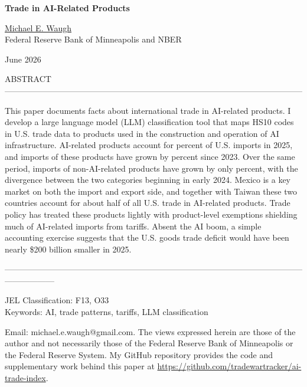 \documentclass[12pt,pdftex]{article}
\begin{document}
\begin{onehalfspacing}

{\large \textbf{Trade in AI-Related Products}}

\vspace{0.5cm}

\href{http://www.waugheconomics.com/}{Michael E. Waugh} \\ Federal Reserve Bank of Minneapolis and NBER

\vspace{0.5cm}

June 2026

\vspace{2.25cm}


\normalsize

ABSTRACT ------------------------------------------------------------------------------------------------------------

This paper documents facts about international trade in AI-related products. I develop a large language model (LLM) classification tool that maps HS10 codes in U.S. trade data to products used in the construction and operation of AI infrastructure. AI-related products account for \aiShareTwentyFive{} percent of U.S. imports in 2025, and imports of these products have grown by \highAiPctChange{} percent since 2023. Over the same period, imports of non-AI-related products have grown by only \lowAiPctChange{} percent, with the divergence between the two categories beginning in early 2024. Mexico is a key market on both the import and export side, and together with Taiwan these two countries account for about half of all U.S. trade in AI-related products. Trade policy has treated these products lightly with product-level exemptions shielding much of AI-related imports from tariffs. Absent the AI boom, a simple accounting exercise suggests that the U.S. goods trade deficit would have been nearly \$200 billion smaller in 2025.

------------------------------------------------------------------------------------------------------------------------------
\vspace{0.25cm}

JEL Classification: F13, O33\\
Keywords: AI, trade patterns, tariffs, LLM classification



\vspace{2.75cm}

{\footnotesize Email: michael.e.waugh@gmail.com. The views expressed herein are those of the author and not necessarily those of the Federal Reserve Bank of Minneapolis or the Federal Reserve System. My GitHub repository provides the code and supplementary work behind this paper at \url{https://github.com/tradewartracker/ai-trade-index}.}


\end{onehalfspacing}
\end{document}
